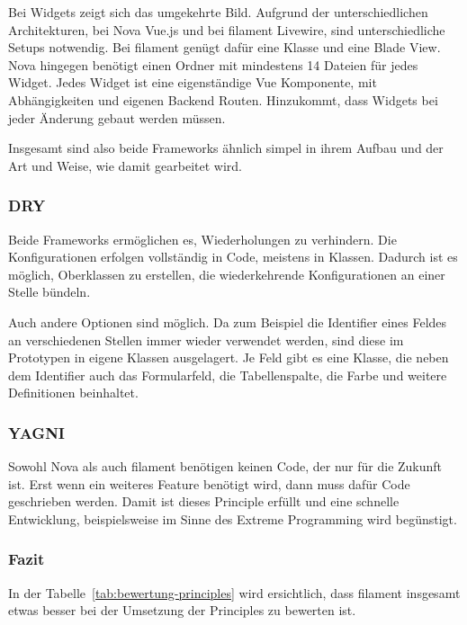 Bei Widgets zeigt sich das umgekehrte Bild.
Aufgrund der unterschiedlichen Architekturen, bei Nova Vue.js und bei filament Livewire, sind unterschiedliche Setups notwendig.
Bei filament genügt dafür eine Klasse und eine Blade View.
Nova hingegen benötigt einen Ordner mit mindestens 14 Dateien für jedes Widget.
Jedes Widget ist eine eigenständige Vue Komponente, mit Abhängigkeiten und eigenen Backend Routen.
Hinzukommt, dass Widgets bei jeder Änderung gebaut werden müssen.

Insgesamt sind also beide Frameworks ähnlich simpel in ihrem Aufbau und der Art und Weise, wie damit gearbeitet wird.

\subsubsection{DRY}
Beide Frameworks ermöglichen es, Wiederholungen zu verhindern.
Die Konfigurationen erfolgen vollständig in Code, meistens in Klassen.
Dadurch ist es möglich, Oberklassen zu erstellen, die wiederkehrende Konfigurationen an einer Stelle bündeln.

Auch andere Optionen sind möglich.
Da zum Beispiel die Identifier eines Feldes an verschiedenen Stellen immer wieder verwendet werden, sind diese im Prototypen in eigene Klassen ausgelagert.
Je Feld gibt es eine Klasse, die neben dem Identifier auch das Formularfeld, die Tabellenspalte, die Farbe und weitere Definitionen beinhaltet.

\subsubsection{YAGNI}
Sowohl Nova als auch filament benötigen keinen Code, der nur für die Zukunft ist.
Erst wenn ein weiteres Feature benötigt wird, dann muss dafür Code geschrieben werden.
Damit ist dieses Principle erfüllt und eine schnelle Entwicklung, beispielsweise im Sinne des Extreme Programming wird begünstigt.

\subsubsection{Fazit}
In der Tabelle~\ref{tab:bewertung-principles} wird ersichtlich, dass filament insgesamt etwas besser bei der Umsetzung der Principles zu bewerten ist.

